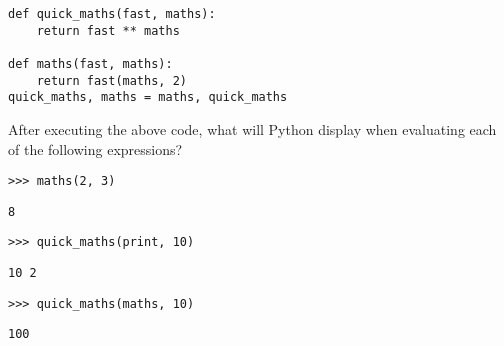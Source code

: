 \begin{blocksection}
\question

\begin{lstlisting}
def quick_maths(fast, maths): 
    return fast ** maths
    
def maths(fast, maths):
    return fast(maths, 2)
quick_maths, maths = maths, quick_maths
\end{lstlisting}

After executing the above code, what will Python
display when evaluating each of the following expressions?

\begin{lstlisting}
>>> maths(2, 3)
\end{lstlisting}
\begin{solution}[0.5in]
\begin{lstlisting}
8
\end{lstlisting}
\end{solution}

\begin{lstlisting}
>>> quick_maths(print, 10)
\end{lstlisting}
\begin{solution}[0.5in]
\begin{lstlisting}
10 2
\end{lstlisting}
\end{solution}

\begin{lstlisting}
>>> quick_maths(maths, 10)
\end{lstlisting}
\begin{solution}[0.5in]
\begin{lstlisting}
100
\end{lstlisting}
\end{solution}
\end{blocksection}
